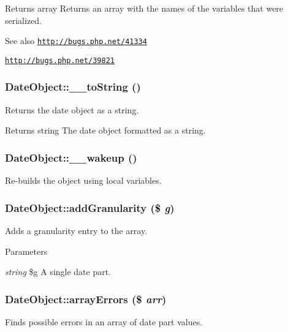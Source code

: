 \begin{DoxyReturn}{Returns}
array Returns an array with the names of the variables that were serialized.
\end{DoxyReturn}
\begin{DoxySeeAlso}{See also}
\href{http://bugs.php.net/41334}{\tt http://bugs.php.net/41334} 

\href{http://bugs.php.net/39821}{\tt http://bugs.php.net/39821} 
\end{DoxySeeAlso}
\hypertarget{classDateObject_ac39c3670e00202a2c3c213edbc8deec8}{
\subsubsection[{\_\-\_\-toString}]{\setlength{\rightskip}{0pt plus 5cm}DateObject::\_\-\_\-toString ()}}
\label{classDateObject_ac39c3670e00202a2c3c213edbc8deec8}
Returns the date object as a string.

\begin{DoxyReturn}{Returns}
string The date object formatted as a string. 
\end{DoxyReturn}
\hypertarget{classDateObject_a6cd3a2ac8b0d69928ba53d04c5486435}{
\subsubsection[{\_\-\_\-wakeup}]{\setlength{\rightskip}{0pt plus 5cm}DateObject::\_\-\_\-wakeup ()}}
\label{classDateObject_a6cd3a2ac8b0d69928ba53d04c5486435}
Re-\/builds the object using local variables. \hypertarget{classDateObject_adcf20b89e2c909ffc82567efcf7d1465}{
\subsubsection[{addGranularity}]{\setlength{\rightskip}{0pt plus 5cm}DateObject::addGranularity (\$ {\em g})}}
\label{classDateObject_adcf20b89e2c909ffc82567efcf7d1465}
Adds a granularity entry to the array.


\begin{DoxyParams}{Parameters}
\item[{\em string}]\$g A single date part. \end{DoxyParams}
\hypertarget{classDateObject_ad79130b614d7207bd4f93577de7d881d}{
\subsubsection[{arrayErrors}]{\setlength{\rightskip}{0pt plus 5cm}DateObject::arrayErrors (\$ {\em arr})}}
\label{classDateObject_ad79130b614d7207bd4f93577de7d881d}
Finds possible errors in an array of date part values.


